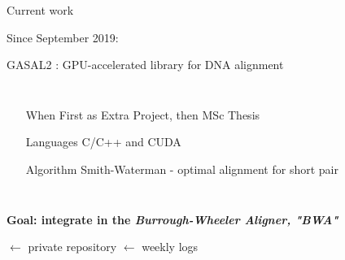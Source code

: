 
\begin{frame}{Current work}

	\begin{center}
		Since September 2019:
		
		GASAL2 : GPU-accelerated library for DNA alignment
	
	\begin{columns}
		\begin{itemize}
			\item[When]	First as Extra Project, then MSc Thesis
			\item[Languages] C/C++ and CUDA
			\item[Algorithm] Smith-Waterman - optimal alignment for short pair
		\end{itemize}	
	\end{columns}

	\bigskip
	\textbf{Goal: integrate in the \emph{Burrough-Wheeler Aligner, "BWA"}}
	\bigskip
	\end{center}
	 $\leftarrow$ private repository
	 $\leftarrow$ weekly logs
	
\end{frame}